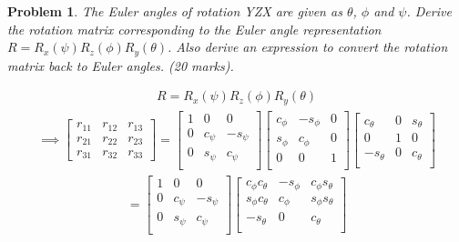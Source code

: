 \documentclass{article}
\newtheorem{prob}{Problem}
\begin{document}
\newpage

\begin{prob}
  The Euler angles of rotation YZX are given as $\theta$, $\phi$ and $\psi$.
  Derive the rotation matrix corresponding to the Euler angle representation $R = R_x(\psi) R_z(\phi) R_y(\theta)$. Also derive an expression to convert the rotation matrix back to Euler angles. (20 marks).
\end{prob}
\begin{align}
  R = R_x(\psi) R_z(\phi) R_y(\theta)
\end{align}
\begin{align}
  \implies \begin{bmatrix}
    r_{11} & r_{12} & r_{13}  \\
    r_{21} & r_{22} & r_{23}  \\
    r_{31} & r_{32} & r_{33}  
  \end{bmatrix}
  =
  \begin{bmatrix}
    1 & 0 & 0\\
    0 & c_\psi & -s_\psi \\
    0 & s_\psi & c_\psi \\
  \end{bmatrix}
  \begin{bmatrix}
    c_\phi & -s_\phi & 0 \\
    s_\phi & c_\phi & 0 \\
    0 & 0 & 1\\
  \end{bmatrix}
  \begin{bmatrix}
    c_\theta & 0 & s_\theta \\
    0 & 1 & 0\\
    -s_\theta & 0 & c_\theta \\
  \end{bmatrix}
\end{align}
\begin{align}
  = \begin{bmatrix}
    1 & 0 & 0\\
    0 & c_\psi & -s_\psi \\
    0 & s_\psi & c_\psi \\
  \end{bmatrix}
  \begin{bmatrix}
    c_\phi c_\theta & - s_\phi & c_\phi s_\theta \\
    s_\phi c_\theta &   c_\phi & s_\phi s_\theta \\
    -s_\theta & 0 & c_\theta \\
  \end{bmatrix}
\end{align}
\end{document}
